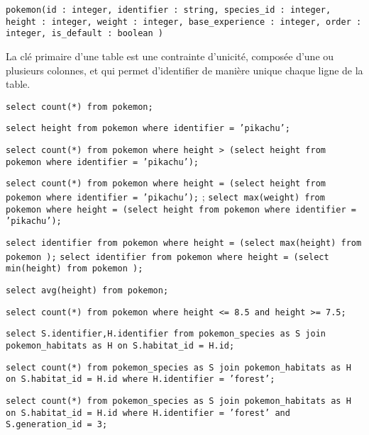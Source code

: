 
\question{}
\texttt{pokemon(id : integer, identifier : string, species\_id : integer, height : integer, weight : integer, base\_experience : integer, order : integer, is\_default : boolean )} 

\question{}
La clé primaire d'une table est une contrainte d'unicité, composée d'une ou plusieurs colonnes, et qui permet d'identifier de manière unique chaque ligne de la table.


\question{}
\texttt{select count(*) from pokemon;}  

\question{}
\texttt{select height from pokemon where identifier = 'pikachu';}  

\question{}
\texttt{select count(*) from pokemon where height > (select height from pokemon where identifier = 'pikachu');}  

\question{}
\texttt{select count(*) from pokemon where height = (select height from pokemon where identifier = 'pikachu');}  ;
\texttt{select max(weight) from pokemon where height = (select height from pokemon where identifier = 'pikachu');} 

\question{}
\texttt{select identifier from pokemon where height = (select max(height) from pokemon );} 
\texttt{select identifier from pokemon where height = (select min(height) from pokemon );}  

\question{}
\texttt{select avg(height) from pokemon;} 


\question{}
 \texttt{select count(*) from pokemon where height <= 8.5 and height >= 7.5;}  

\question{}
\texttt{select S.identifier,H.identifier from pokemon\_species as S join pokemon\_habitats as H on S.habitat\_id = H.id;}

\question{}
\texttt{select count(*) from pokemon\_species as S join pokemon\_habitats as H on S.habitat\_id = H.id where H.identifier = 'forest';}   


\question{}
\texttt{select count(*) from pokemon\_species as S join pokemon\_habitats as H on S.habitat\_id = H.id where H.identifier = 'forest' and S.generation\_id = 3;} 


